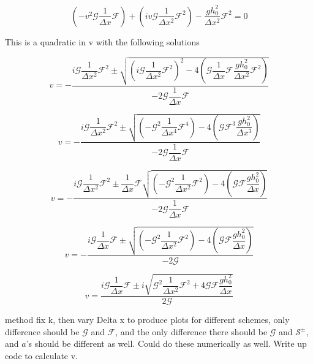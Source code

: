 \documentclass[12pt]{article}
\begin{document}
\[\left(-v^2\mathcal{G}\dfrac{1}{\Delta x} \mathcal{F} \right) + \left(iv \mathcal{G}\dfrac{1}{\Delta x^2} \mathcal{F}^2\right) -  \dfrac{gh_0^2}{\Delta x^2} \mathcal{F}^2  =0\]

This is a quadratic in v with the following solutions

\[v = - \frac{  i\mathcal{G}\dfrac{1}{\Delta x^2} \mathcal{F}^2\pm \sqrt{\left(i \mathcal{G}\dfrac{1}{\Delta x^2} \mathcal{F}^2\right)^2 - 4 \left(\mathcal{G}\dfrac{1}{\Delta x} \mathcal{F} \dfrac{gh_0^2}{\Delta x^2} \mathcal{F}^2\right)}}{-2\mathcal{G}\dfrac{1}{\Delta x} \mathcal{F}  }\]

\[v = - \frac{  i\mathcal{G}\dfrac{1}{\Delta x^2} \mathcal{F}^2\pm \sqrt{\left(-\mathcal{G}^2\dfrac{1}{\Delta x^4} \mathcal{F}^4\right) - 4 \left(\mathcal{G} \mathcal{F}^3 \dfrac{gh_0^2}{\Delta x^3}\right)}}{-2\mathcal{G}\dfrac{1}{\Delta x} \mathcal{F}  }\]

\[v = - \frac{  i\mathcal{G}\dfrac{1}{\Delta x^2} \mathcal{F}^2\pm  \dfrac{1}{\Delta x} \mathcal{F}\sqrt{\left(-\mathcal{G}^2\dfrac{1}{\Delta x^2} \mathcal{F}^2\right) - 4 \left(\mathcal{G} \mathcal{F} \dfrac{gh_0^2}{\Delta x}\right)}}{-2\mathcal{G}\dfrac{1}{\Delta x} \mathcal{F}  }\]

\[v = - \frac{  i\mathcal{G}\dfrac{1}{\Delta x} \mathcal{F}\pm  \sqrt{\left(-\mathcal{G}^2\dfrac{1}{\Delta x^2} \mathcal{F}^2\right) - 4 \left(\mathcal{G} \mathcal{F} \dfrac{gh_0^2}{\Delta x}\right)}}{-2\mathcal{G} }\]

\[v = \frac{  i\mathcal{G}\dfrac{1}{\Delta x} \mathcal{F}\pm i  \sqrt{\mathcal{G}^2\dfrac{1}{\Delta x^2} \mathcal{F}^2 + 4 \mathcal{G} \mathcal{F} \dfrac{gh_0^2}{\Delta x}}}{2\mathcal{G} }\]

method fix k, then vary Delta x to produce plots for different schemes, only difference should be $\mathcal{G}$ and $\mathcal{F}$, and the only difference there should be $\mathcal{G}$ and $\mathcal{S}^\pm$, and $a$'s should be different as well. Could do these numerically as well. Write up code to calculate v. 
\end{document}
